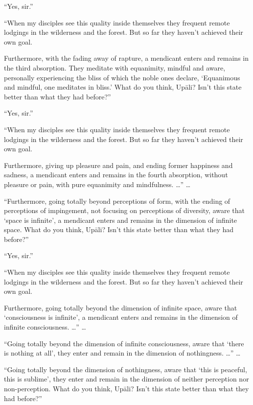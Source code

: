 \documentclass[12pt,openany]{book}%
\begin{document}
“Yes, sir.” 

“When my disciples see this quality inside themselves they frequent remote lodgings in the wilderness and the forest. But so far they haven’t achieved their own goal. 

Furthermore, with the fading away of rapture, a mendicant enters and remains in the third absorption. They meditate with equanimity, mindful and aware, personally experiencing the bliss of which the noble ones declare, ‘Equanimous and mindful, one meditates in bliss.’ What do you think, \textsanskrit{Upāli}? Isn’t this state better than what they had before?” 

“Yes, sir.” 

“When my disciples see this quality inside themselves they frequent remote lodgings in the wilderness and the forest. But so far they haven’t achieved their own goal. 

Furthermore, giving up pleasure and pain, and ending former happiness and sadness, a mendicant enters and remains in the fourth absorption, without pleasure or pain, with pure equanimity and mindfulness. …” … 

“Furthermore, going totally beyond perceptions of form, with the ending of perceptions of impingement, not focusing on perceptions of diversity, aware that ‘space is infinite’, a mendicant enters and remains in the dimension of infinite space. What do you think, \textsanskrit{Upāli}? Isn’t this state better than what they had before?” 

“Yes, sir.” 

“When my disciples see this quality inside themselves they frequent remote lodgings in the wilderness and the forest. But so far they haven’t achieved their own goal. 

Furthermore, going totally beyond the dimension of infinite space, aware that ‘consciousness is infinite’, a mendicant enters and remains in the dimension of infinite consciousness. …” … 

“Going totally beyond the dimension of infinite consciousness, aware that ‘there is nothing at all’, they enter and remain in the dimension of nothingness. …” … 

“Going totally beyond the dimension of nothingness, aware that ‘this is peaceful, this is sublime’, they enter and remain in the dimension of neither perception nor non-perception. What do you think, \textsanskrit{Upāli}? Isn’t this state better than what they had before?” 
\end{document}
